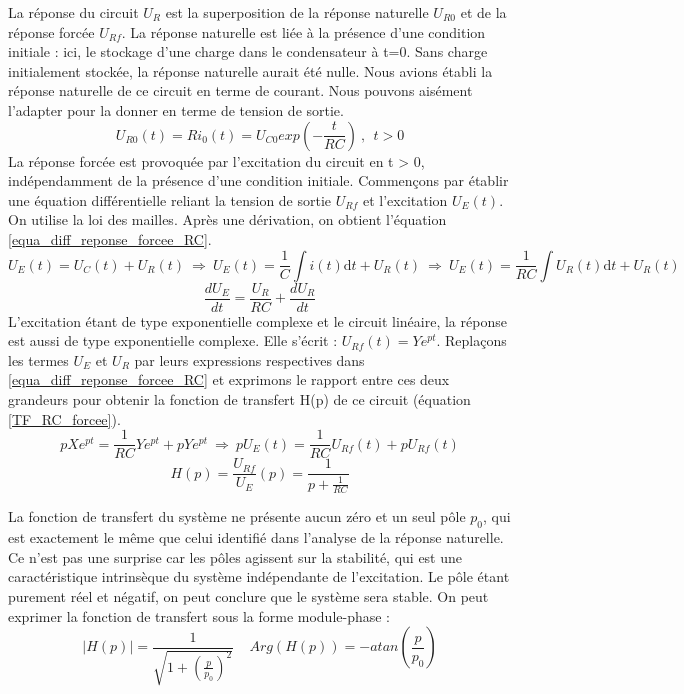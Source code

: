 \documentclass[]{report}
\newcommand{\deriv}{\mathrm{d}}
\begin{document}
	La réponse du circuit $U_{R}$ est la superposition de la réponse naturelle $U_{R0}$ et de la réponse forcée $U_{Rf}$. La réponse naturelle est liée à la présence d'une condition initiale : ici, le stockage d'une charge dans le condensateur à t=0. Sans charge initialement stockée, la réponse naturelle aurait été nulle. Nous avions établi la réponse naturelle de ce circuit en terme de courant. Nous pouvons aisément l'adapter pour la donner en terme de tension de sortie.
	\begin{equation*}\label{}
	U_{R0}(t)=Ri_{0}(t)=U_{C0}exp(-\frac{t}{RC})~,~~t>0
	\end{equation*}
	La réponse forcée est provoquée par l'excitation du circuit en t > 0, indépendamment de la présence d'une condition initiale. Commençons par établir une équation différentielle reliant la tension de sortie $U_{Rf}$ et l'excitation $U_{E}(t)$. On utilise la loi des mailles. Après une dérivation, on obtient l'équation \ref{equa_diff_reponse_forcee_RC}.
	\begin{equation*}\label{}
	U_{E}(t)=U_{C}(t)+U_{R}(t) ~ \Rightarrow ~ U_{E}(t)=\frac{1}{C}\int i(t) \deriv t+U_{R}(t)~ \Rightarrow ~U_{E}(t)=\frac{1}{RC}\int U_{R}(t) \deriv t+U_{R}(t)
	\end{equation*} 
	\begin{equation}\label{equa_diff_reponse_forcee_RC}
	\frac{dU_{E}}{dt}=\frac{U_{R}}{RC}+\frac{dU_{R}}{dt}
	\end{equation}
	L'excitation étant de type exponentielle complexe et le circuit linéaire, la réponse est aussi de type exponentielle complexe. Elle s'écrit : $U_{Rf}(t)=Ye^{pt}$. Replaçons les termes $U_{E}$ et $U_{R}$ par leurs expressions respectives dans \ref{equa_diff_reponse_forcee_RC} et exprimons le rapport entre ces deux grandeurs pour obtenir la fonction de transfert H(p) de ce circuit (équation \ref{TF_RC_forcee}).
	\begin{equation*}
	pXe^{pt}=\frac{1}{RC} Ye^{pt}+pYe^{pt} ~\Rightarrow~pU_{E}(t)=\frac{1}{RC}U_{Rf}(t)+pU_{Rf}(t)
	\end{equation*}
	\begin{equation}\label{TF_RC_forcee}
	H(p)=\frac{U_{Rf}}{U_{E}}(p)=\frac{1}{p+\frac{1}{RC}}
	\end{equation}

	La fonction de transfert du système ne présente aucun zéro et un seul pôle $p_{0}$, qui est exactement le même que celui identifié dans l'analyse de la réponse naturelle. Ce n'est pas une surprise car les pôles agissent sur la stabilité, qui est une caractéristique intrinsèque du système indépendante de l'excitation. Le pôle étant purement réel et négatif, on peut conclure que le système sera stable. On peut exprimer la fonction de transfert sous la forme module-phase :
	\begin{equation*}
	|H(p)|=\frac{1}{\sqrt{1+(\frac{p}{p_{0}})^{2}}}~~~~~Arg(H(p))=-atan(\frac{p}{p_{0}})
	\end{equation*}
	
\end{document}
